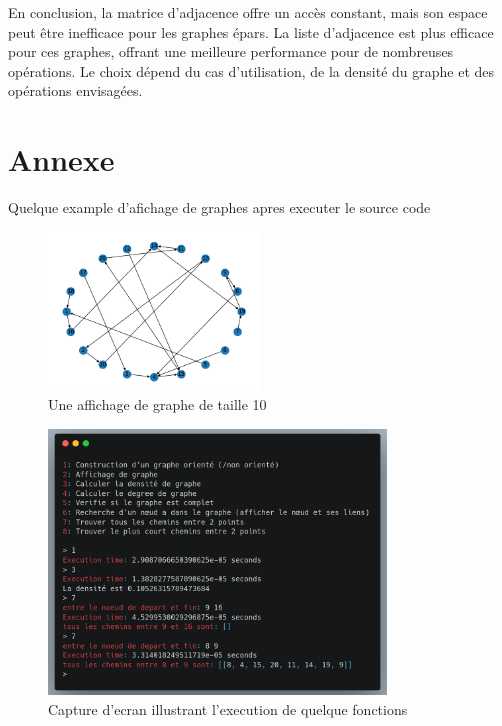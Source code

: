 \documentclass{report}
\begin{document}
En conclusion, la matrice d'adjacence offre un accès constant, mais son espace peut être inefficace pour les graphes épars. La liste d'adjacence est plus efficace pour ces graphes, offrant une meilleure performance pour de nombreuses opérations. Le choix dépend du cas d'utilisation, de la densité du graphe et des opérations envisagées.

\clearpage
\section{Annexe}
Quelque example d'afichage de graphes apres executer le source code
\begin{figure}[ht]
    \centering
    \includegraphics[width=0.5\textwidth]{./graph20.png}
    \caption{Une affichage de graphe de taille 10}
\end{figure}

\begin{figure}[ht]
    \centering
    \includegraphics[width=0.8\textwidth]{./code.png}
    \caption{Capture d'ecran illustrant l'execution de quelque fonctions}
\end{figure}
\end{document}
